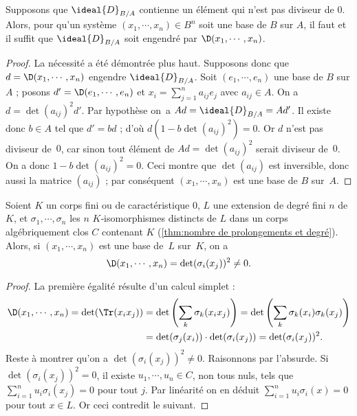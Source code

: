 \documentclass[11pt, %
  title in boldface,
  theorem in new line,
  theorem numbering = section,
  number theorems separately,
  simple name,
]{beaulivre}
\begin{document}
    \begin{proposition}
        Supposons que \( \ideal{D}_{B/A} \) contienne un élément qui n'est pas diviseur de \( 0 \). Alors, pour qu'un système \( (x_1, \cdots, x_n) \in B^n \) soit une base de \( B \) sur \( A \), il faut et il suffit que \( \ideal{D}_{B/A} \) soit engendré par \( \D(x_1, \cdots, x_n) \).
    \end{proposition}
    \begin{proof}
        La nécessité a été démontrée plus haut. Supposons donc que \( d = \D(x_1, \cdots, x_n) \) engendre \( \ideal{D}_{B/A} \). Soit \( (e_1, \cdots, e_n) \) une base de \( B \) sur \( A \) ; posons \( d' = \D(e_1, \cdots, e_n) \) et \( x_i = \sum_{j=1}^n a_{ij} e_j \) avec \( a_{ij} \in A \). On a \( d = \det(a_{ij})^2 d' \). Par hypothèse on~a \( Ad = \ideal{D}_{B/A} = Ad' \). Il existe donc \( b \in A \) tel que \( d' = bd \) ; d'où \( d(1-b \det(a_{ij})^2) = 0 \). Or \( d \) n'est pas diviseur de~\( 0 \), car sinon tout élément de \( Ad = \det(a_{ij})^2 \) serait diviseur de~\( 0 \). On a donc \( 1-b \det(a_{ij})^2 = 0 \). Ceci montre que \( \det(a_{ij}) \) est inversible, donc aussi la matrice \( (a_{ij}) \) ; par conséquent \( (x_1, \cdots, x_n) \) est une base de \( B \) sur~\( A \).
    \end{proof}

    \begin{proposition}\label{prop:disc et det;K-isomorphismes}
        Soient \( K \) un corps fini ou de caractéristique \( 0 \), \( L \) une extension de degré fini \( n \) de \( K \), et \( \sigma_1, \cdots, \sigma_n \) les \( n \) \( K \)‑isomorphismes distincts de \( L \) dans un corps algébriquement clos \( C \) contenant \( K \) (\cref{thm:nombre de prolongements et degré}). Alors, si \( (x_1, \cdots, x_n) \) est une base de~\( L \) sur~\( K \), on a
        \begin{equation}
            \D(x_1, \cdots, x_n) = \det(\sigma_i(x_j))^2 \neq 0.
        \end{equation}
    \end{proposition}
    \begin{proof}
        La première égalité résulte d'un calcul simplet :
        \begin{align*}
            \D(x_1, \cdots, x_n) = \det(\Tr(x_i x_j)) &= \det\left(\sum_k \sigma_k(x_i x_j)\right) = \det\left(\sum_k \sigma_k(x_i) \sigma_k(x_j)\right)\\
            &= \det(\sigma_j(x_i)) \cdot \det(\sigma_i(x_j)) = \det(\sigma_i(x_j))^2.
        \end{align*}
        Reste à montrer qu'on a \( \det(\sigma_i(x_j))^2 \neq 0 \). Raisonnons par l'absurde. Si \mbox{\( \det(\sigma_i(x_j))^2 = 0 \)}, il existe \( u_1, \cdots, u_n \in C \), non tous nuls, tels que \( \sum_{i=1}^n u_i \sigma_i (x_j) = 0 \) pour tout \( j \). Par linéarité on en déduit \( \sum_{i=1}^n u_i \sigma_i (x) = 0 \) pour tout \( x \in L \). Or ceci contredit le  suivant.
    \end{proof}
\end{document}
